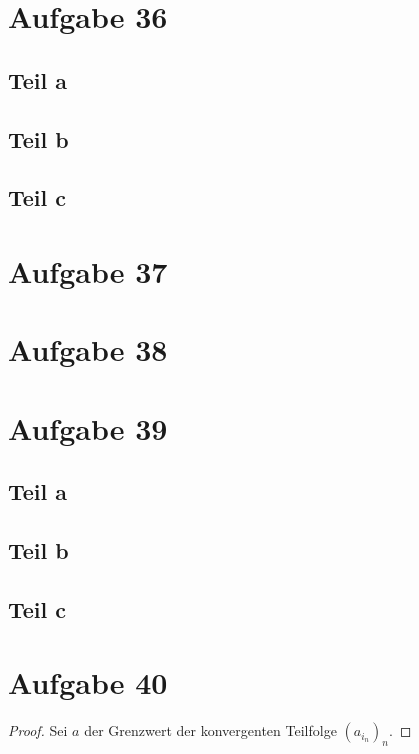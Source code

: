 \documentclass[10pt,a4paper]{article}
\begin{document}
\section{Aufgabe 36}

\subsection{Teil a}

\subsection{Teil b}

\subsection{Teil c}

\section{Aufgabe 37}

\section{Aufgabe 38}

\section{Aufgabe 39}

\subsection{Teil a}

\subsection{Teil b}

\subsection{Teil c}

\section{Aufgabe 40}
\begin{proof}
  Sei $a$ der Grenzwert der konvergenten Teilfolge $(a_{i_{n}})_{n}$.

\end{proof}
\end{document}
